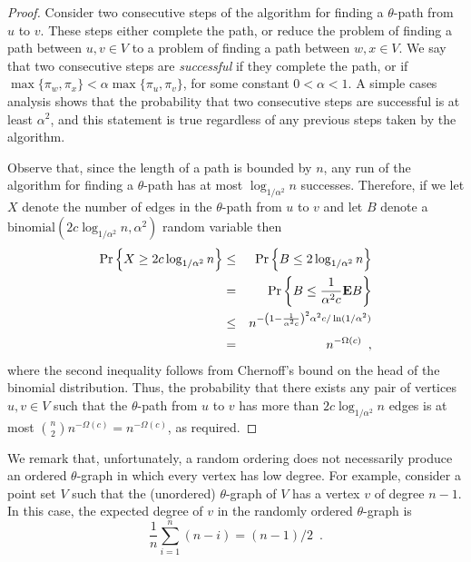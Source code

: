 \documentclass{elsart}
\newcommand{\E}{\mathbf{E}}
\begin{document}
\begin{proof}
Consider two consecutive steps of the algorithm for finding a
$\theta$-path from $u$ to $v$.  These steps either complete the path,
or reduce the problem of finding a path between $u,v\in V$ to a
problem of finding a path between $w,x\in V$.  We say that two
consecutive steps are \emph{successful} if they complete the path, or
if $\max\{\pi_w,\pi_x\}<\alpha\max\{\pi_u,\pi_v\}$, for some constant
$0<\alpha<1$.  A simple cases analysis shows that the probability that
two consecutive steps are successful is at least $\alpha^2$, and this
statement is true regardless of any previous steps taken by the
algorithm.

Observe that, since the length of a path is bounded by $n$, any run of
the algorithm for finding a $\theta$-path has at most
$\log_{1/\alpha^2}n$ successes.  Therefore, if we let $X$ denote the
number of edges in the $\theta$-path from $u$ to $v$ and let $B$
denote a $\mathrm{binomial}(2c\log_{1/\alpha^2} n, \alpha^2)$ random
variable then
\begin{eqnarray*}
  \Pr\left\{X\ge2c\log_{1/\alpha^2} n\right\} 
  & \le & \Pr\left\{B\le 2\log_{1/\alpha^2} n\right\} \\
  & = & \Pr\left\{B\le \frac{1}{\alpha^2c}\E B\right\} \\
  & \le & \comment{\exp\left(-\left(1-\frac{1}{\alpha^2c}\right)^2\alpha^2c\log_{1/\alpha^2} n\right) \\
  & = &} n^{-\left(1-\frac{1}{\alpha^2c}\right)^2\alpha^2c/\ln(1/\alpha^2)} \\
  & = &  n^{-\Omega(c)} \enspace ,
\end{eqnarray*}
where the second inequality follows from Chernoff's bound on the head
of the binomial distribution.  Thus, the probability that there exists
any pair of vertices $u,v\in V$ such that the $\theta$-path from $u$
to $v$ has more than $2c\log_{1/\alpha^2} n$ edges is at most
${n\choose 2}n^{-\Omega(c)}=n^{-\Omega(c)}$, as required.
\end{proof}

We remark that, unfortunately, a random ordering does not necessarily
produce an ordered $\theta$-graph in which every vertex has low
degree.  For example, consider a point set $V$ such that the
(unordered) $\theta$-graph of $V$ has a vertex $v$ of degree $n-1$.
In this case, the expected degree of $v$ in the randomly ordered
$\theta$-graph is
\[
  \frac{1}{n}\sum_{i=1}^n (n-i) = (n-1)/2 \enspace . 
\]


\end{document}
